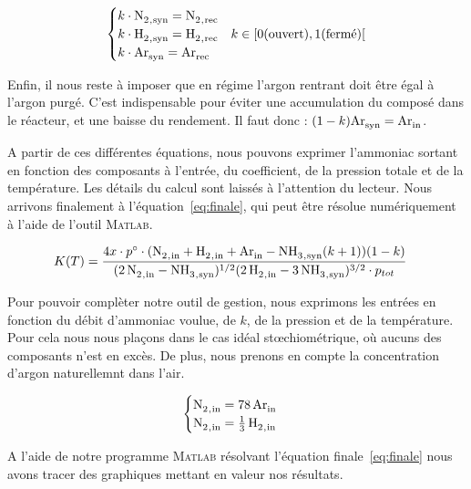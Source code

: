 $$
\begin{cases}
 k\cdot \ce{N2_{,syn}} = \ce{N2_{,rec}} \\ 
 k\cdot \ce{H2_{,syn}} = \ce{H2_{,rec}} & k \in [0 \text{(ouvert)}, 1 \text{(fermé)}[ \\
 k\cdot \ce{Ar_{syn}} = \ce{Ar_{rec}} \\
\end{cases}
$$

Enfin, il nous reste à imposer que en régime l'argon rentrant doit être égal
à l'argon purgé. C'est indispensable pour éviter une accumulation du composé
dans le réacteur, et une baisse du rendement. 
Il faut donc : $(1 - k)\ce{Ar_{syn}} = \ce{Ar_{in}}$.

A partir de ces différentes équations, nous pouvons exprimer l'ammoniac
sortant en fonction des composants à l'entrée, du coefficient, de la pression
totale et de la température. Les détails du calcul sont laissés à l'attention 
du lecteur. Nous arrivons finalement à l'équation~\eqref{eq:finale}, qui peut
être résolue numériquement à l'aide de l'outil \textsc{Matlab}.

\begin{align}
	K(T) & = \frac{4x\cdot p\std \cdot (\ce{N2_{,in} + H2_{,in} + Ar_{in}} - 
	\ce{NH3_{,syn}}(k + 1)) (1 - k)}{(\ce{2N2_{,in} - NH3_{,syn}})^{1/2} (\ce{2H2_{,in} - 3NH3_{,syn}})^{3/2} \cdot p_{tot}}
	\label{eq:finale}
\end{align}

Pour pouvoir complèter notre outil de gestion, nous exprimons les entrées 
en fonction du débit d'ammoniac voulue, de $k$, de la pression et de la
température. Pour cela nous nous plaçons dans le cas idéal stœchiométrique,
où aucuns des composants n'est en excès. De plus, nous prenons en compte la 
concentration d'argon naturellemnt dans l'air. 
 
$$
\begin{cases}
 \ce{N2_{,in}} = \ce{78Ar_{in}}\\ 
 \ce{N2_{,in}} = \ce{1/3H2_{,in}} \\
\end{cases}
$$
 
A l'aide de notre programme \textsc{Matlab} résolvant l'équation finale~\eqref{eq:finale}  nous avons tracer des graphiques mettant en valeur nos résultats.

